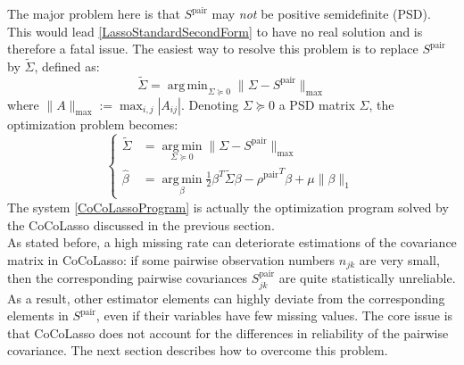 \documentclass[]{article}
\DeclareMathOperator*{\argmin}{arg\,min}
\begin{document}
The major problem here is that $S^{\text{pair}}$ may \textit{not} be positive semidefinite (PSD). This would lead \eqref{LassoStandardSecondForm} to have no real solution and is therefore a fatal issue. The easiest way to resolve this problem is to replace $S^{\text{pair}}$ by $\tilde{\Sigma}$, defined as:
\begin{equation}
	\tilde{\Sigma} = \argmin_{\Sigma \succeq 0} \|\Sigma - S^{\text{pair}}\|_{\text{max}}
\end{equation}
where $\|A\|_{\text{max}} := \max_{i,j} |A_{ij}|$.
Denoting $\Sigma \succeq 0$ a PSD matrix $\Sigma$, the optimization problem becomes:
\begin{equation}
	\label{CoCoLassoProgram}
	\left\{
	\begin{array}{ll}
	\tilde{\Sigma} &= \argmin\limits_{\Sigma \succeq 0} \|\Sigma - S^{\text{pair}}\|_{\text{max}}\\
	\hat{\beta} &= \argmin\limits_{\beta} \frac{1}{2}\beta^T \tilde{\Sigma}\beta - {\rho^{\text{pair}}}^T\beta + \mu \|\beta\|_1\end{array}\right.
\end{equation}
The system \eqref{CoCoLassoProgram} is actually the optimization program solved by the CoCoLasso discussed in the previous section.\\

\noindent
As stated before, a high missing rate can deteriorate estimations of the covariance matrix in CoCoLasso: if some pairwise observation numbers $n_{jk}$ are very small, then the corresponding pairwise covariances $S^{\text{pair}}_{jk}$ are quite statistically unreliable. As a result, other estimator elements can highly deviate from the corresponding elements in $S^{\text{pair}}$, even if their variables have few missing values. The core issue is that CoCoLasso does not account for the differences in reliability of the pairwise covariance. The next section describes how to overcome this problem.
\end{document}
